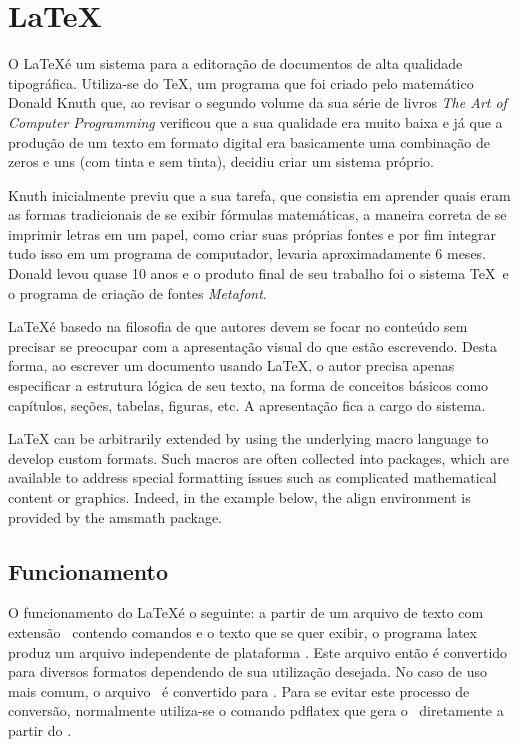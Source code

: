 \section{\LaTeX}
O \LaTeX é um sistema para a editoração de documentos de alta qualidade tipográfica. Utiliza-se do \TeX, um programa que foi criado pelo matemático Donald Knuth que, ao revisar o segundo volume da sua série de livros {\slshape The Art of Computer Programming} verificou que a sua qualidade era muito baixa e já que a produção de um texto em formato digital era basicamente uma combinação de zeros e uns (com tinta e sem tinta), decidiu criar um sistema próprio.

Knuth inicialmente previu que a sua tarefa, que consistia em aprender quais eram as formas tradicionais de se exibir fórmulas matemáticas, a maneira correta de se imprimir letras em um papel, como criar suas próprias fontes e por fim integrar tudo isso em um programa de computador, levaria aproximadamente 6 meses. Donald levou quase 10 anos e o produto final de seu trabalho foi o sistema \TeX \ e o programa de criação de fontes \textit{Metafont}.

\LaTeX é basedo na filosofia de que autores devem se focar no conteúdo sem precisar se preocupar com a apresentação visual do que estão escrevendo. Desta forma, ao escrever um documento usando \LaTeX, o autor precisa apenas especificar a estrutura lógica de seu texto, na forma de conceitos básicos como capítulos, seções, tabelas, figuras, etc. A apresentação fica a cargo do sistema.

LaTeX can be arbitrarily extended by using the underlying macro language to develop custom formats. Such macros are often collected into packages, which are available to address special formatting issues such as complicated mathematical content or graphics. Indeed, in the example below, the align environment is provided by the amsmath package.

\subsection{Funcionamento}

O funcionamento do \LaTeX é o seguinte: a partir de um arquivo de texto com extensão \tex\ contendo comandos e o texto que se quer exibir, o programa \textsf{latex} produz um arquivo independente de plataforma \dvi. Este arquivo então é convertido para diversos formatos dependendo de sua utilização desejada. No caso de uso mais comum, o arquivo \dvi\ é convertido para \pdf. Para se evitar este processo de conversão, normalmente utiliza-se o comando \textsf{pdflatex} que gera o \pdf\ diretamente a partir do \tex.

